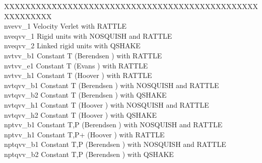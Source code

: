 \begin{tabbing}
XXXXXXXXX\=XXXXXXXXXXXXXXXXXXXXXXXXXXXXXXXXXXXXXXXXXXXXXXXX\kill\\
{\sc nvevv\_1}    \>  Velocity Verlet with RATTLE \\
{\sc nveqvv\_1}   \>  Rigid units with NOSQUISH and RATTLE\\
{\sc nveqvv\_2}   \>  Linked rigid units with QSHAKE \\
{\sc nvtvv\_b1}   \>  Constant T (Berendsen \cite{berendsen-84a}) with RATTLE \\
{\sc nvtvv\_e1}   \>  Constant T (Evans \cite{evans-84a}) with RATTLE \\
{\sc nvtvv\_h1}   \>  Constant T (Hoover \cite{hoover-85a}) with RATTLE \\
{\sc nvtqvv\_b1}  \>  Constant T (Berendsen \cite{berendsen-84a}) with NOSQUISH and RATTLE \\
{\sc nvtqvv\_b2}  \>  Constant T (Berendsen \cite{berendsen-84a}) with QSHAKE \\
{\sc nvtqvv\_h1}  \>  Constant T (Hoover \cite{hoover-85a}) with NOSQUISH and RATTLE \\
{\sc nvtqvv\_h2}  \>  Constant T (Hoover \cite{hoover-85a}) with QSHAKE \\
{\sc nptvv\_b1}   \>  Constant T,P (Berendsen \cite{berendsen-84a}) with NOSQUISH and RATTLE \\
{\sc nptvv\_h1}   \>  Constant T,P+ (Hoover \cite{hoover-85a}) with RATTLE \\
{\sc nptqvv\_b1}  \>  Constant T,P (Berendsen \cite{berendsen-84a}) with NOSQUISH and RATTLE\\
{\sc nptqvv\_b2}  \>  Constant T,P (Berendsen \cite{berendsen-84a}) with QSHAKE \\

\end{tabbing}
